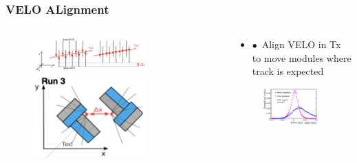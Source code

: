 \documentclass[aspectratio=1610, 12pt, xcolor=dvipsnames]{beamer}
\begin{document}
\begin{frame}\frametitle{VELO ALignment}
  \begin{columns}
    \begin{column}[c]{0.5\textwidth}
      \begin{figure}
        \includegraphics[width=0.7\textwidth]{plots/velo_tracks_before_after.png}
        \includegraphics[width=0.7\textwidth]{plots/velo_deltax.png}
      \end{figure}
    \end{column}
    \begin{column}{0.5\textwidth}
      \begin{itemize}
        \item $\bullet$\, Align VELO in Tx to move modules where track is expected
      \end{itemize}
      \begin{figure}
        \centering
        \includegraphics[width=0.9\textwidth]{plots/PVx_velo.png}
      \end{figure}
    \end{column}
  \end{columns}
\end{frame}
\end{document}
